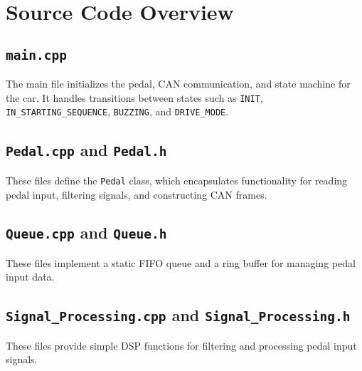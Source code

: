 \documentclass[a4paper,12pt]{article}
\begin{document}
\section{Source Code Overview}
\subsection{\texttt{main.cpp}}
The main file initializes the pedal, CAN communication, and state machine for the car. It handles transitions between states such as \texttt{INIT}, \texttt{IN\_STARTING\_SEQUENCE}, \texttt{BUZZING}, and \texttt{DRIVE\_MODE}.



\subsection{\texttt{Pedal.cpp} and \texttt{Pedal.h}}
These files define the \texttt{Pedal} class, which encapsulates functionality for reading pedal input, filtering signals, and constructing CAN frames.





\subsection{\texttt{Queue.cpp} and \texttt{Queue.h}}
These files implement a static FIFO queue and a ring buffer for managing pedal input data.





\subsection{\texttt{Signal\_Processing.cpp} and \texttt{Signal\_Processing.h}}
These files provide simple DSP functions for filtering and processing pedal input signals.
\end{document}
